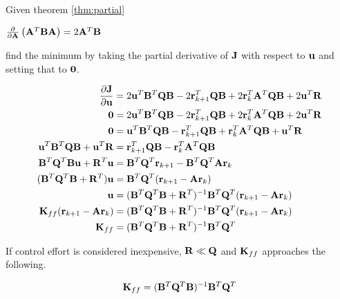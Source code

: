 Given theorem \ref{thm:partial}

\begin{theorem}
  $\frac{\partial}{\partial\mathbf{A}}\left(\mathbf{A}^T\mathbf{B}\mathbf{A}\right) =
    2\mathbf{A}^T\mathbf{B}$
  \label{thm:partial}
\end{theorem}

find the minimum by taking the partial derivative of $\mathbf{J}$ with respect to
$\mathbf{u}$ and setting that to $\mathbf{0}$.

\begin{align}
  \frac{\partial\mathbf{J}}{\partial\mathbf{u}} &=
    2\mathbf{u}^T\mathbf{B}^T\mathbf{Q}\mathbf{B} - 2\mathbf{r}_{k+1}^T\mathbf{Q}\mathbf{B} +
    2\mathbf{r}_k^T\mathbf{A}^T\mathbf{Q}\mathbf{B} + 2\mathbf{u}^T\mathbf{R} \nonumber \\
  \mathbf{0} &= 2\mathbf{u}^T\mathbf{B}^T\mathbf{Q}\mathbf{B} -
    2\mathbf{r}_{k+1}^T\mathbf{Q}\mathbf{B} + 2\mathbf{r}_k^T\mathbf{A}^T\mathbf{Q}\mathbf{B} +
    2\mathbf{u}^T\mathbf{R} \nonumber \\
  \mathbf{0} &= \mathbf{u}^T\mathbf{B}^T\mathbf{Q}\mathbf{B} - \mathbf{r}_{k+1}^T\mathbf{Q}\mathbf{B} +
    \mathbf{r}_k^T\mathbf{A}^T\mathbf{Q}\mathbf{B} + \mathbf{u}^T\mathbf{R} \nonumber \\
  \mathbf{u}^T\mathbf{B}^T\mathbf{Q}\mathbf{B} + \mathbf{u}^T\mathbf{R} &=
    \mathbf{r}_{k+1}^T\mathbf{Q}\mathbf{B} - \mathbf{r}_k^T\mathbf{A}^T\mathbf{Q}\mathbf{B}
    \nonumber \\
  \mathbf{B}^T\mathbf{Q}^T\mathbf{B}\mathbf{u} + \mathbf{R}^T\mathbf{u} &=
    \mathbf{B}^T\mathbf{Q}^T\mathbf{r}_{k+1} - \mathbf{B}^T\mathbf{Q}^T\mathbf{A}\mathbf{r}_k
    \nonumber \\
  (\mathbf{B}^T\mathbf{Q}^T\mathbf{B} + \mathbf{R}^T)\mathbf{u} &=
    \mathbf{B}^T\mathbf{Q}^T(\mathbf{r}_{k+1} - \mathbf{A}\mathbf{r}_k) \nonumber \\
  \mathbf{u} &= (\mathbf{B}^T\mathbf{Q}^T\mathbf{B} +
    \mathbf{R}^T)^{-1}\mathbf{B}^T\mathbf{Q}^T(\mathbf{r}_{k+1} - \mathbf{A}\mathbf{r}_k)
    \nonumber \\
  \mathbf{K}_{ff}(\mathbf{r}_{k+1} - \mathbf{A}\mathbf{r}_k) &=
    (\mathbf{B}^T\mathbf{Q}^T\mathbf{B} +
    \mathbf{R}^T)^{-1}\mathbf{B}^T\mathbf{Q}^T(\mathbf{r}_{k+1} - \mathbf{A}\mathbf{r}_k)
    \nonumber \\
  \mathbf{K}_{ff} &= (\mathbf{B}^T\mathbf{Q}^T\mathbf{B} + \mathbf{R}^T)^{-1}\mathbf{B}^T\mathbf{Q}^T
\end{align}

If control effort is considered inexpensive, $\mathbf{R} \ll \mathbf{Q}$ and
$\mathbf{K}_{ff}$ approaches the following.

\begin{equation}
  \mathbf{K}_{ff} = (\mathbf{B}^T\mathbf{Q}^T\mathbf{B})^{-1}\mathbf{B}^T\mathbf{Q}^T
\end{equation}
